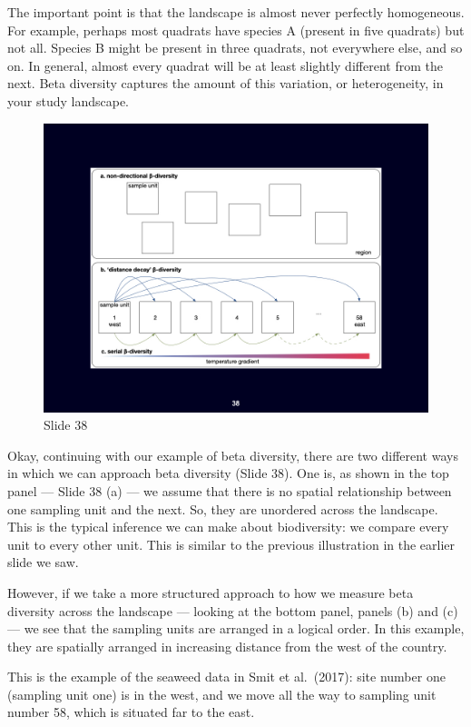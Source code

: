 \documentclass[
  10pt,
]{book}
\begin{document}
The important point is that the landscape is almost never perfectly
homogeneous. For example, perhaps most quadrats have species A (present
in five quadrats) but not all. Species B might be present in three
quadrats, not everywhere else, and so on. In general, almost every
quadrat will be at least slightly different from the next. Beta
diversity captures the amount of this variation, or heterogeneity, in
your study landscape.

\begin{figure}[ht]
\centering
\includegraphics[width=0.8\linewidth]{../images/BDC334/BDC334-038.jpeg}
\caption*{Slide 38}
\end{figure}

Okay, continuing with our example of beta diversity, there are two
different ways in which we can approach beta diversity (Slide 38). One
is, as shown in the top panel --- Slide 38 (a) --- we assume that there
is no spatial relationship between one sampling unit and the next. So,
they are unordered across the landscape. This is the typical inference
we can make about biodiversity: we compare every unit to every other
unit. This is similar to the previous illustration in the earlier slide
we saw.

However, if we take a more structured approach to how we measure beta
diversity across the landscape --- looking at the bottom panel, panels
(b) and (c) --- we see that the sampling units are arranged in a logical
order. In this example, they are spatially arranged in increasing
distance from the west of the country.

This is the example of the seaweed data in Smit et al.~(2017): site
number one (sampling unit one) is in the west, and we move all the way
to sampling unit number 58, which is situated far to the east.
\end{document}
